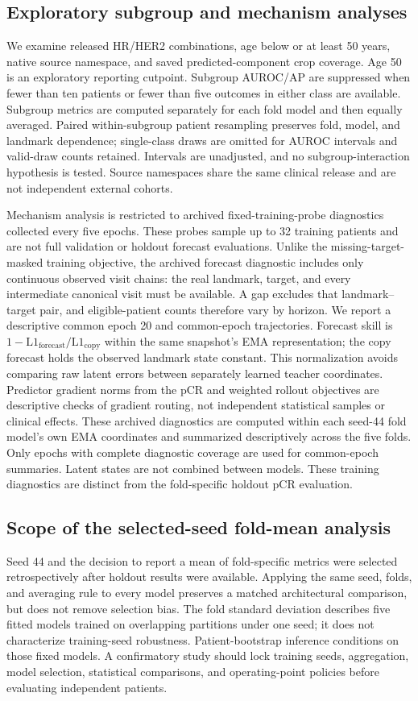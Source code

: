 \subsection{Exploratory subgroup and mechanism analyses}
We examine released HR/HER2 combinations, age below or at least 50 years, native source namespace, and saved predicted-component crop coverage. Age 50 is an exploratory reporting cutpoint. Subgroup AUROC/AP are suppressed when fewer than ten patients or fewer than five outcomes in either class are available. Subgroup metrics are computed separately for each fold model and then equally averaged. Paired within-subgroup patient resampling preserves fold, model, and landmark dependence; single-class draws are omitted for AUROC intervals and valid-draw counts retained. Intervals are unadjusted, and no subgroup-interaction hypothesis is tested. Source namespaces share the same clinical release and are not independent external cohorts.

Mechanism analysis is restricted to archived fixed-training-probe diagnostics collected every five epochs. These probes sample up to 32 training patients and are not full validation or holdout forecast evaluations. Unlike the missing-target-masked training objective, the archived forecast diagnostic includes only continuous observed visit chains: the real landmark, target, and every intermediate canonical visit must be available. A gap excludes that landmark--target pair, and eligible-patient counts therefore vary by horizon. We report a descriptive common epoch 20 and common-epoch trajectories. Forecast skill is $1-\mathrm{L1}_{\mathrm{forecast}}/\mathrm{L1}_{\mathrm{copy}}$ within the same snapshot's EMA representation; the copy forecast holds the observed landmark state constant. This normalization avoids comparing raw latent errors between separately learned teacher coordinates. Predictor gradient norms from the pCR and weighted rollout objectives are descriptive checks of gradient routing, not independent statistical samples or clinical effects. These archived diagnostics are computed within each seed-44 fold model's own EMA coordinates and summarized descriptively across the five folds. Only epochs with complete diagnostic coverage are used for common-epoch summaries. Latent states are not combined between models. These training diagnostics are distinct from the fold-specific holdout pCR evaluation.

\subsection{Scope of the selected-seed fold-mean analysis}
Seed 44 and the decision to report a mean of fold-specific metrics were selected retrospectively after holdout results were available. Applying the same seed, folds, and averaging rule to every model preserves a matched architectural comparison, but does not remove selection bias. The fold standard deviation describes five fitted models trained on overlapping partitions under one seed; it does not characterize training-seed robustness. Patient-bootstrap inference conditions on those fixed models. A confirmatory study should lock training seeds, aggregation, model selection, statistical comparisons, and operating-point policies before evaluating independent patients.
